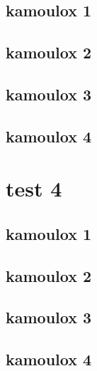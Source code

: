 \documentclass[12pt,a4paper]{book}
\begin{document}
	\section{kamoulox 1}
	\lipsum 
	\section{kamoulox 2}
	\lipsum 
	\section{kamoulox 3}
	\lipsum 
	\section{kamoulox 4}
	\lipsum 

	\chapter{test 4}
	\section{kamoulox 1}
	\lipsum 
	\section{kamoulox 2}
	\lipsum 
	\section{kamoulox 3}
	\lipsum 
	\section{kamoulox 4}
	\lipsum 
%	
%	
%	
	\closeout\glossaireVar
	\appendix

%	
%	
\end{document}
